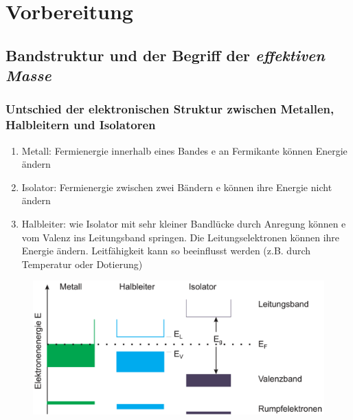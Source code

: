 \section{Vorbereitung}

\subsection{Bandstruktur und der Begriff der \textit{effektiven Masse}}

\subsubsection*{Untschied der elektronischen Struktur zwischen Metallen, Halbleitern und Isolatoren}
\begin{enumerate}
\item Metall:     
    Fermienergie innerhalb eines Bandes \to e an Fermikante können Energie ändern
\item Isolator:   
    Fermienergie zwischen zwei Bändern  \to e können ihre Energie nicht ändern
\item Halbleiter: 
    wie Isolator mit sehr kleiner Bandlücke \to durch Anregung können e vom Valenz ins Leitungsband springen.
    Die Leitungselektronen können ihre Energie ändern.
    Leitfähigkeit kann so beeinflusst werden (z.B. durch Temperatur oder Dotierung)
\end{enumerate}
\begin{figure}[H]
    \centering
    \includegraphics[scale=0.4]{pictures/Bandstrukturen.png}
    \caption{\cite{Halbleiter-Grundlagen}}
\end{figure}

